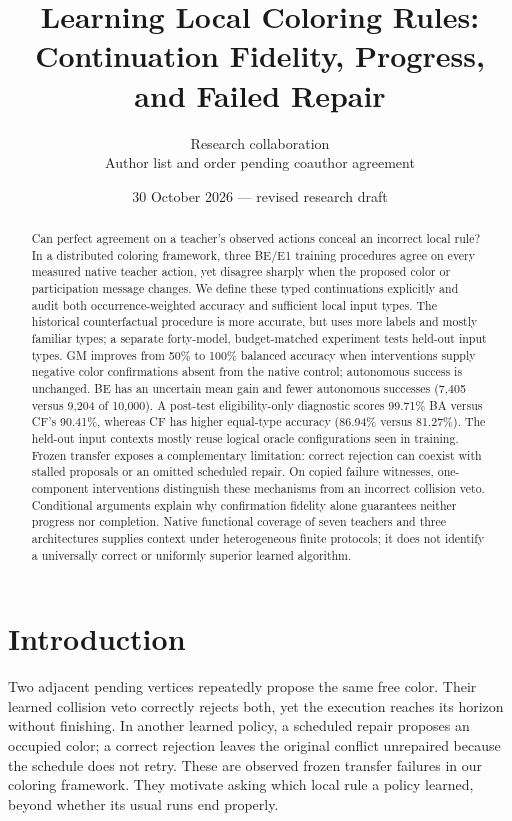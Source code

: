 \documentclass[10pt]{article}
\title{Learning Local Coloring Rules:\\Continuation Fidelity, Progress, and Failed Repair}
\author{Research collaboration\\Author list and order pending coauthor agreement}
\date{30 October 2026 --- revised research draft}
\begin{document}
\maketitle
\begin{abstract}
Can perfect agreement on a teacher's observed actions conceal an incorrect
local rule? In a distributed coloring framework, three BE/E1 training
procedures agree on every measured native teacher action, yet disagree
sharply when the proposed color or participation message changes. We define
these typed continuations explicitly and audit both occurrence-weighted
accuracy and sufficient local input types. The historical counterfactual
procedure is more accurate, but uses more labels and mostly familiar types;
a separate forty-model, budget-matched experiment tests held-out input types.
GM improves from 50\% to 100\% balanced accuracy when interventions supply
negative color confirmations absent from the native control; autonomous
success is unchanged. BE has an uncertain mean gain and fewer autonomous
successes (7,405 versus 9,204 of 10,000). A post-test eligibility-only
diagnostic scores 99.71\% BA versus CF's 90.41\%, whereas CF has higher
equal-type accuracy (86.94\% versus 81.27\%). The held-out input contexts
mostly reuse logical oracle configurations seen in training.
Frozen transfer exposes a complementary limitation: correct rejection can
coexist with stalled proposals or an omitted scheduled repair. On copied
failure witnesses, one-component interventions distinguish these mechanisms
from an incorrect collision veto. Conditional arguments explain why
confirmation fidelity alone guarantees neither progress nor completion.
Native functional coverage of seven teachers and three architectures supplies
context under heterogeneous finite protocols; it does not identify a
universally correct or uniformly superior learned algorithm.
\end{abstract}

\section{Introduction}
Two adjacent pending vertices repeatedly propose the same free color. Their
learned collision veto correctly rejects both, yet the execution reaches its
horizon without finishing. In another learned policy, a scheduled repair
proposes an occupied color; a correct rejection leaves the original conflict
unrepaired because the schedule does not retry. These are observed frozen
transfer failures in our coloring framework. They motivate asking which
local rule a policy learned, beyond whether its usual runs end properly.
\end{document}
